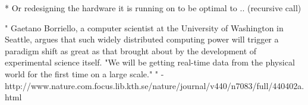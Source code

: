 \documentclass{article}
\begin{document}
    * Or redesigning the hardware it is running on to be optimal to .. (recursive
    call)


"
Gaetano Borriello, a computer scientist at the University of Washington in
Seattle, argues that such widely distributed computing power will trigger a
paradigm shift as great as that brought about by the development of
experimental science itself. "We will be getting real-time data from the
physical world for the first time on a large scale."
" - http://www.nature.com.focus.lib.kth.se/nature/journal/v440/n7083/full/440402a.html



%   
%      
%
%
%
%





\end{document}

